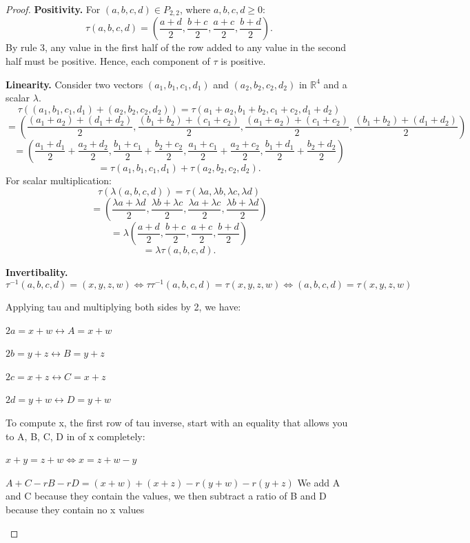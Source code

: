 \documentclass[11pt]{amsart}
\theoremstyle{definition}
\begin{document}
\begin{proof}
\textbf{Positivity.} For \((a, b, c, d) \in P_{2,2}\), where \(a, b, c, d \geq 0\):
\[
\tau(a, b, c, d) = \left( \frac{a+d}{2}, \frac{b+c}{2}, \frac{a+c}{2}, \frac{b+d}{2} \right).
\]
By rule 3, any value in the first half of the row added to any value in the second half must be positive. Hence, each component of $\tau$ is positive.

\textbf{Linearity.} Consider two vectors \((a_1, b_1, c_1, d_1)\) and \((a_2, b_2, c_2, d_2)\) in \(\mathbb{R}^4\) and a scalar \(\lambda\).
\[
\tau((a_1, b_1, c_1, d_1) + (a_2, b_2, c_2, d_2)) = \tau(a_1 + a_2, b_1 + b_2, c_1 + c_2, d_1 + d_2)
\]
\[
= \left( \frac{(a_1 + a_2) + (d_1 + d_2)}{2}, \frac{(b_1 + b_2) + (c_1 + c_2)}{2}, \frac{(a_1 + a_2) + (c_1 + c_2)}{2}, \frac{(b_1 + b_2) + (d_1 + d_2)}{2} \right)
\]
\[
= \left( \frac{a_1 + d_1}{2} + \frac{a_2 + d_2}{2}, \frac{b_1 + c_1}{2} + \frac{b_2 + c_2}{2}, \frac{a_1 + c_1}{2} + \frac{a_2 + c_2}{2}, \frac{b_1 + d_1}{2} + \frac{b_2 + d_2}{2} \right)
\]
\[
= \tau(a_1, b_1, c_1, d_1) + \tau(a_2, b_2, c_2, d_2).
\]
For scalar multiplication:
\[
\tau(\lambda(a, b, c, d)) = \tau(\lambda a, \lambda b, \lambda c, \lambda d)
\]
\[
= \left( \frac{\lambda a + \lambda d}{2}, \frac{\lambda b + \lambda c}{2}, \frac{\lambda a + \lambda c}{2}, \frac{\lambda b + \lambda d}{2} \right)
\]
\[
= \lambda \left( \frac{a + d}{2}, \frac{b + c}{2}, \frac{a + c}{2}, \frac{b + d}{2} \right)
\]
\[
= \lambda \tau(a, b, c, d).
\]

\textbf{Invertibality.}
\[
\tau^{-1}(a,b,c,d) = (x,y,z,w) \Leftrightarrow \tau\tau^{-1}(a,b,c,d) = \tau(x,y,z,w) \Leftrightarrow (a,b,c,d) = \tau(x,y,z,w)
\]

Applying tau and multiplying both sides by 2, we have:

\begin{center}
    $2a = x + w \leftrightarrow A = x + w$ 
    
    $2b = y + z \leftrightarrow B = y + z$
    
    $2c = x + z \leftrightarrow C = x + z$
    
    $2d = y + w \leftrightarrow D = y + w$
\end{center}

To compute x, the first row of tau inverse, start with an equality that allows you to A, B, C, D in of x completely:
\begin{center}
    $x + y = z + w \Leftrightarrow x = z + w - y$

    $A + C - rB - rD = (x + w) + (x+z) - r(y+w) - r(y+z)$ We add A and C because they contain the values, we then subtract a ratio of B and D because they contain no x values


\end{center}
\end{proof}
\end{document}
